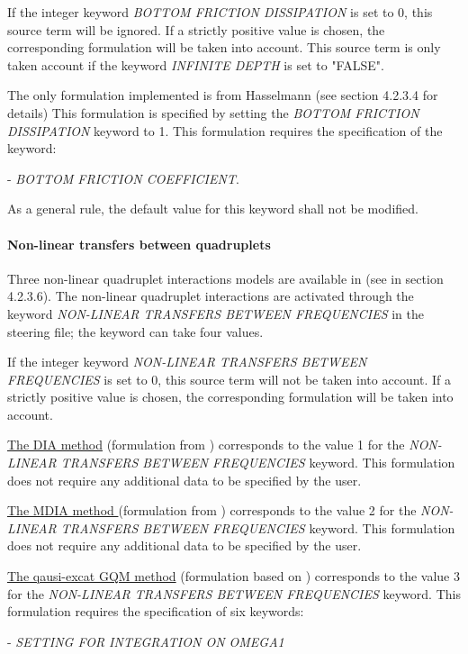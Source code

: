  If the integer keyword \textit{BOTTOM FRICTION DISSIPATION} is set to 0, this source term will be ignored. If a strictly positive value is chosen, the corresponding formulation will be taken into account. This source term is only taken account if the keyword \textit{INFINITE DEPTH} is set to "FALSE".

 The only formulation implemented is from Hasselmann (see section 4.2.3.4 for details) This formulation is specified by setting the \textit{BOTTOM FRICTION DISSIPATION} keyword to 1. This formulation requires the specification of the keyword:

  - \textit{BOTTOM FRICTION COEFFICIENT}.

 As a general rule, the default value for this keyword shall not be modified.


\paragraph{ Non-linear transfers between quadruplets}

 Three non-linear quadruplet interactions models are available in \tomawac (see in section 4.2.3.6). The non-linear quadruplet interactions are activated through the keyword \textit{NON-LINEAR TRANSFERS BETWEEN FREQUENCIES} in the steering file; the keyword can take four values.

 If the integer keyword \textit{NON-LINEAR TRANSFERS BETWEEN FREQUENCIES} is set to 0, this source term will not be taken into account. If a strictly positive value is chosen, the corresponding formulation will be taken into account.

 \underline{  The DIA method} (formulation from \cite{Hasselmann1985_1}) corresponds to the value 1 for the \textit{NON-LINEAR TRANSFERS BETWEEN FREQUENCIES} keyword. This formulation does not require any additional data to be specified by the user.

 \underline{The MDIA method }(formulation from \cite{Tolman2004}) corresponds to the value 2 for the \textit{NON-LINEAR TRANSFERS BETWEEN FREQUENCIES} keyword. This formulation does not require any additional data to be specified by the user.

 \underline{The qausi-excat GQM method} (formulation based on \cite{Lavrenov2001}) corresponds to the value 3 for the \textit{NON-LINEAR TRANSFERS BETWEEN FREQUENCIES} keyword. This formulation requires the specification of six keywords:

- \textit{SETTING FOR INTEGRATION ON OMEGA1}

